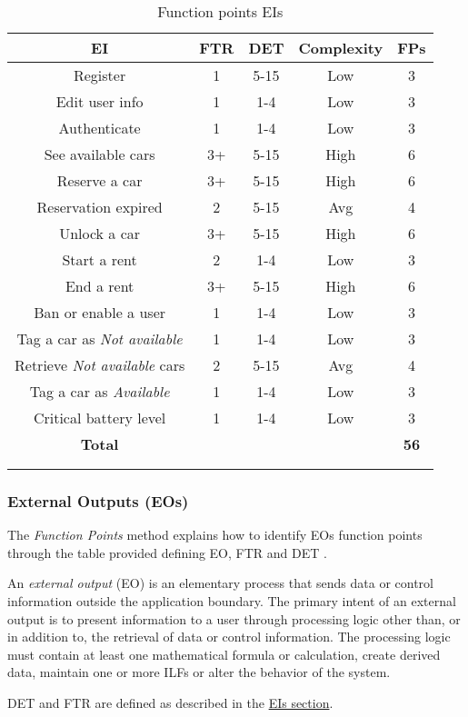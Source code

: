 \begin{longtable}{ccccc}
\toprule
\textbf{EI}	& FTR & DET & 	Complexity  & \textbf{FPs}\\
\midrule
Register & 1 & 5-15 &	Low & 3 \\
Edit user info & 1 & 1-4 &	Low & 3 \\
Authenticate &1 & 1-4 & Low & 3 \\
See available cars & 3+ & 5-15 & High & 6 \\
Reserve a car & 3+ & 5-15 & High & 6 \\
Reservation expired & 2 & 5-15 & Avg & 4 \\
Unlock a car & 3+ & 5-15 & High & 6 \\
Start a rent & 2 & 1-4 &	Low & 3 \\
End a rent & 3+ & 5-15 & High & 6 \\
Ban or enable a user & 1 & 1-4 &	Low & 3 \\
Tag a car as \emph{Not available} & 1 & 1-4 &	Low & 3 \\
Retrieve \emph{Not available} cars & 2 & 5-15 & Avg & 4\\
Tag a car as \emph{Available} & 1 & 1-4 &	Low & 3\\
Critical battery level & 1 & 1-4 &	Low & 3\\
\midrule
\textbf{Total} & & & &  \textbf{56}\\
\bottomrule \\
\caption{Function points EIs}
\label{tbl:eiFP}
\end{longtable}


\subsubsection{External Outputs (EOs)} 

The \emph{Function Points} method explains how to identify EOs function points through the table provided defining EO, FTR and DET \cite{FP}.

An \textit{external output} (EO) is an elementary process that sends data or control information outside the application boundary. The primary intent of an external output is to present information to a user through processing logic other than, or in addition to, the retrieval of data or control information. The processing logic must contain at least one mathematical formula or calculation, create derived data, maintain one or more ILFs or alter the behavior of the system.

DET and FTR are defined as described in the \hyperref[sec:EIs]{EIs section}.\\

